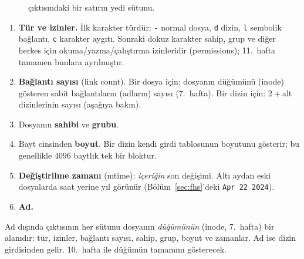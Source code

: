 \begin{figure}[H]
\centering
{}
\caption{ çıktısındaki bir satırın yedi sütunu.}
\label{fig:lsl}
\end{figure}

\begin{enumerate}[leftmargin=1.4em]
  \item \textbf{Tür ve izinler.} İlk karakter türdür: \texttt{-} normal dosya, \texttt{d} dizin, \texttt{l} sembolik bağlantı, \texttt{c} karakter aygıtı. Sonraki dokuz karakter sahip, grup ve diğer herkes için okuma/yazma/çalıştırma izinleridir (permissions); 11.\ hafta tamamen bunlara ayrılmıştır.
  \item \textbf{Bağlantı sayısı} (link count). Bir dosya için: dosyanın düğümünü (inode) gösteren sabit bağlantıların (adların) sayısı (7.\ hafta). Bir dizin için: $2 + {}$alt dizinlerinin sayısı (aşağıya bakın).
  \item Dosyanın \textbf{sahibi} ve \textbf{grubu}.
  \item Bayt cinsinden \textbf{boyut}. Bir dizin kendi girdi tablosunun boyutunu gösterir; bu genellikle $4096$ baytlık tek bir bloktur.
  \item \textbf{Değiştirilme zamanı} (mtime): \emph{içeriğin} son değişimi. Altı aydan eski dosyalarda saat yerine yıl görünür (Bölüm~\ref{sec:fhs}'deki \texttt{Apr 22 2024}).
  \item \textbf{Ad.}
\end{enumerate}

\begin{keyidea}
Ad dışında  çıktısının her sütunu dosyanın \emph{düğümünün} (inode, 7.\ hafta) bir alanıdır: tür, izinler, bağlantı sayısı, sahip, grup, boyut ve zamanlar. Ad ise dizin girdisinden gelir. 10.\ hafta  ile düğümün tamamını gösterecek.
\end{keyidea}

